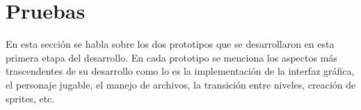 \section{Pruebas}
En esta sección se habla sobre los dos prototipos que se desarrollaron en esta 
primera etapa del desarrollo. En cada prototipo se menciona los aspectos más 
trascendentes de su desarrollo como lo es la implementación de la interfaz 
gráfica, el personaje jugable, el manejo de archivos, la transición entre 
niveles, creación de sprites, etc.    


		